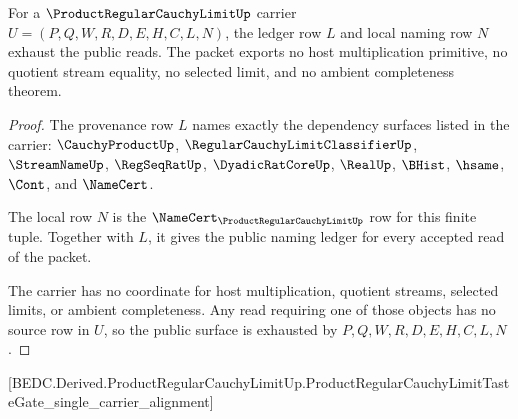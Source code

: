\begin{theorem}
\label{thm:product-regular-cauchy-limit-ledger-exactness}
For a $\ProductRegularCauchyLimitUp$ carrier $U=(P,Q,W,R,D,E,H,C,L,N)$, the ledger row $L$ and local naming row $N$ exhaust the public reads. The packet exports no host multiplication primitive, no quotient stream equality, no selected limit, and no ambient completeness theorem.
\end{theorem}
\begin{proof}
The provenance row $L$ names exactly the dependency surfaces listed in the carrier: $\CauchyProductUp$, $\RegularCauchyLimitClassifierUp$, $\StreamNameUp$, $\RegSeqRatUp$, $\DyadicRatCoreUp$, $\RealUp$, $\BHist$, $\hsame$, $\Cont$, and $\NameCert$.

The local row $N$ is the $\NameCert_{\ProductRegularCauchyLimitUp}$ row for this finite tuple. Together with $L$, it gives the public naming ledger for every accepted read of the packet.

The carrier has no coordinate for host multiplication, quotient streams, selected limits, or ambient completeness. Any read requiring one of those objects has no source row in $U$, so the public surface is exhausted by $P,Q,W,R,D,E,H,C,L,N$.
\end{proof}

[BEDC.Derived.ProductRegularCauchyLimitUp.ProductRegularCauchyLimitTasteGate\_single\_carrier\_alignment]

